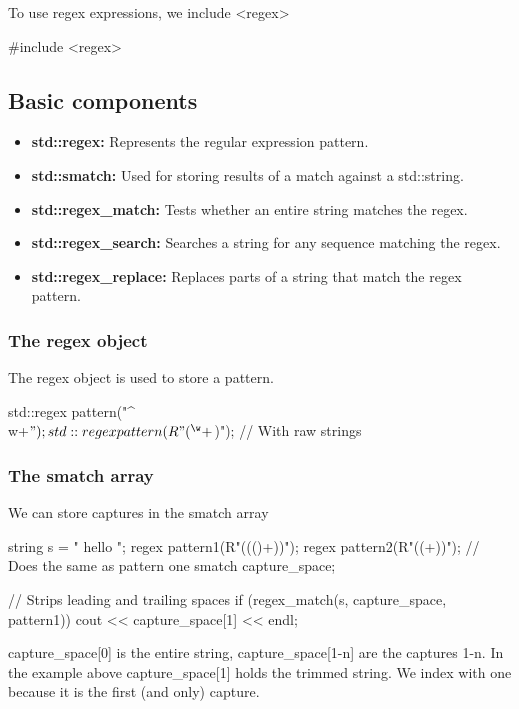 \documentclass{report}
\begin{document}
    \pagebreak 
    \bigbreak \noindent 
    To use regex expressions, we include <regex>
    \bigbreak \noindent 
    \begin{cppcode}
    #include <regex>
    \end{cppcode}
    \bigbreak \noindent 
    \subsection{Basic components}
    \bigbreak \noindent 
    \begin{itemize}
        \item \textbf{std::regex:} Represents the regular expression pattern.
        \item \textbf{std::smatch:} Used for storing results of a match against a std::string.
        \item \textbf{std::regex\_match:} Tests whether an entire string matches the regex.
        \item \textbf{std::regex\_search:} Searches a string for any sequence matching the regex.
        \item \textbf{std::regex\_replace:} Replaces parts of a string that match the regex pattern.
    \end{itemize}
    \bigbreak \noindent 
    \subsubsection{The regex object}
    \bigbreak \noindent 
    The regex object is used to store a pattern.
    \bigbreak \noindent 
    \begin{cppcode}
        std::regex pattern("^\\w+$");
        std::regex pattern(R"(^\w+$)"); // With raw strings
    \end{cppcode}
    \bigbreak \noindent 
    \subsubsection{The smatch array}
    \bigbreak \noindent 
    We can store captures in the smatch array
    \bigbreak \noindent 
    \begin{cppcode}
        string s = "     hello     ";
        regex pattern1(R"(\s*((\w)+)\s*)");
        regex pattern2(R"(\s*(\w+)\s*)"); // Does the same as pattern one
        smatch capture_space;

        // Strips leading and trailing spaces
        if (regex_match(s, capture_space, pattern1)) {
            cout << capture_space[1] << endl;
        }
    \end{cppcode}
    \bigbreak \noindent 
    capture\_space[0] is the entire string, capture\_space[1-n] are the captures 1-n. In the example above capture\_space[1] holds the trimmed string. We index with one because it is the first (and only) capture.
\end{document}

